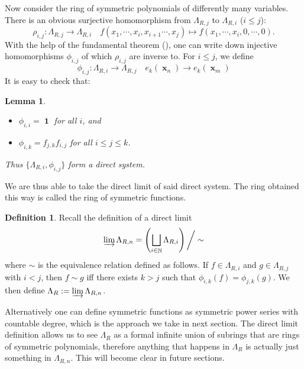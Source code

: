 \documentclass{amsart}
\theoremstyle{plain}
\newtheorem{lemma}[theorem]{Lemma}
\theoremstyle{definition}
\newtheorem{definition}[theorem]{Definition}
\DeclareMathOperator{\nn}{\mathbb{N}}
\DeclareMathOperator{\id}{\textbf{1}}
\DeclareMathOperator{\xx}{\textbf{x}}
\begin{document}
Now consider the ring of symmetric polynomials of differently many variables. There is an obvious surjective homomorphism from $\Lambda_{R,j}$ to $\Lambda_{R,i}$  ($i\leq j$):
\[\rho_{i,j}:\Lambda_{R,j}\to \Lambda_{R,i}\quad f(x_1,\cdots,x_i,x_{i+1}\cdots,x_j)\mapsto f(x_1,\cdots,x_i,0,\cdots,0).\]
With the help of the fundamental theorem (), one can write down injective homomorphisms $\phi_{i,j}$ of which $\rho_{i,j}$ are inverse to. For $i\leq j$, we define
\[\phi_{i,j}:\Lambda_{R,i}\to \Lambda_{R,j}\quad e_k(\xx_n)\to e_k(\xx_m)\]
It is easy to check that:
\begin{lemma}
	\begin{itemize}
		\item $\phi_{i,i}=\id$ for all $i$, and
		\item $\phi_{i,k}=f_{j,k}f_{i,j}$ for all $i\leq j\leq k$.
	\end{itemize}
	Thus $\{\Lambda_{R,i},\phi_{i,j}\}$ form a direct system.
\end{lemma}
We are thus able to take the direct limit of said direct system. The ring obtained this way is called the ring of symmetric functions.
\begin{definition}
	Recall the definition of a direct limit
	\[\varinjlim \Lambda_{R,n}=\left(\bigsqcup_{i\in\nn}\Lambda_{R,i}\right)\bigg/\sim\]
	where $\sim$ is the equivalence relation defined as follows. If $f\in \Lambda_{R,i}$ and $g\in \Lambda_{R,j}$ with $i<j$, then $f\sim g$ iff there exists $k>j$ such that $\phi_{i,k}(f)=\phi_{j,k}(g)$. We then define $\Lambda_{R}:=\varinjlim \Lambda_{R,n}$.
\end{definition}
Alternatively one can define symmetric functions as symmetric power series with countable degree, which is the approach we take in next section. The direct limit definition allows us to see $\Lambda_R$ as a formal infinite union of subrings that are rings of symmetric polynomials, therefore anything that happens in $\Lambda_R$ is actually just something in $\Lambda_{R,n}$. This will become clear in future sections.
\end{document}
